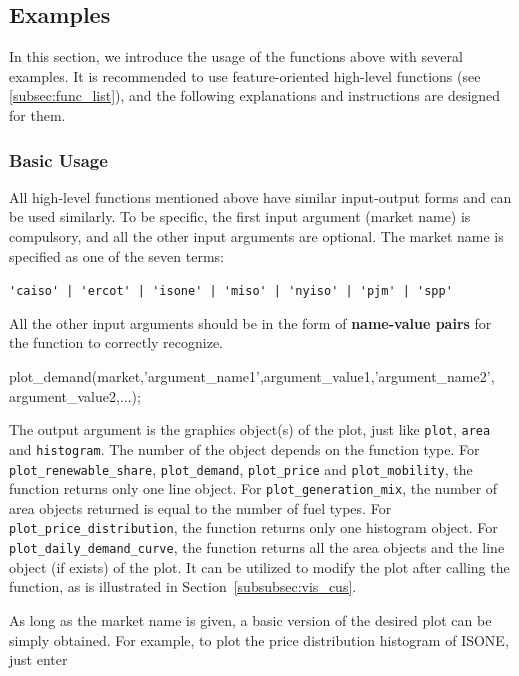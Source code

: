 \documentclass[10pt]{article}
\numberwithin{equation}{section}
\numberwithin{table}{section}
\numberwithin{figure}{section}
\begin{document}
\subsection{Examples}

In this section, we introduce the usage of the functions above with several examples. It is recommended to use feature-oriented high-level functions (see \ref{subsec:func_list}), and the following explanations and instructions are designed for them.

\subsubsection{Basic Usage} \label{subsubsec:vis_basic}

All high-level functions mentioned above have similar input-output forms and can be used similarly. To be specific, the first input argument (market name) is compulsory, and all the other input arguments are optional. The market name is specified as one of the seven terms:

\begin{center}
  \verb!'caiso' | 'ercot' | 'isone' | 'miso' | 'nyiso' | 'pjm' | 'spp'!
\end{center}

All the other input arguments should be in the form of \textbf{name-value pairs} for the function to correctly recognize.

\begin{Command}
plot_demand(market,'argument_name1',argument_value1,'argument_name2',
argument_value2,...);
\end{Command}

The output argument is the graphics object(s) of the plot, just like \verb!plot!, \verb!area! and \verb!histogram!. The number of the object depends on the function type. For \verb!plot_renewable_share!, \verb!plot_demand!, \verb!plot_price! and \verb!plot_mobility!, the function returns only one line object. For \verb!plot_generation_mix!, the number of area objects returned is equal to the number of fuel types. For \verb!plot_price_distribution!, the function returns only one histogram object. For \verb!plot_daily_demand_curve!, the function returns all the area objects and the line object (if exists) of the plot. It can be utilized to modify the plot after calling the function, as is illustrated in Section~\ref{subsubsec:vis_cus}.

As long as the market name is given, a basic version of the desired plot can be simply obtained. For example, to plot the price distribution histogram of ISONE, just enter
\end{document}
